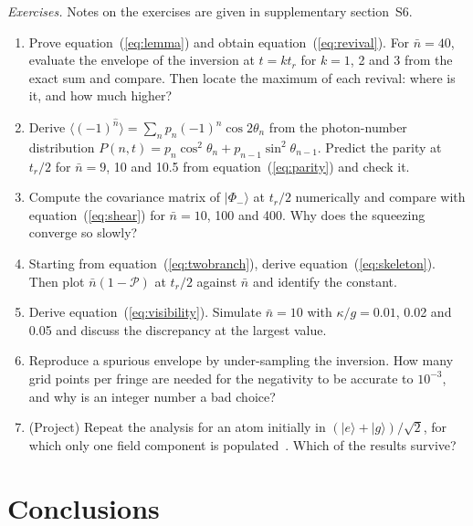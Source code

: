 \documentclass{iopjournal}
\newcommand{\nbar}{\bar{n}}
\newcommand{\ket}[1]{|#1\rangle}
\begin{document}
\textit{Exercises.} Notes on the exercises are given in supplementary section~S6.
\begin{enumerate}
\item Prove equation~(\ref{eq:lemma}) and obtain equation~(\ref{eq:revival}). For $\nbar = 40$, evaluate the envelope of the inversion at $t = kt_r$ for $k = 1$, 2 and 3 from the exact sum and compare. Then locate the maximum of each revival: where is it, and how much higher?
\item Derive $\langle(-1)^{\hat n}\rangle = \sum_n p_n(-1)^n\cos 2\theta_n$ from the photon-number distribution $P(n,t) = p_n\cos^2\theta_n + p_{n-1}\sin^2\theta_{n-1}$. Predict the parity at $t_r/2$ for $\nbar = 9$, 10 and 10.5 from equation~(\ref{eq:parity}) and check it.
\item Compute the covariance matrix of $\ket{\Phi_-}$ at $t_r/2$ numerically and compare with equation~(\ref{eq:shear}) for $\nbar = 10$, 100 and 400. Why does the squeezing converge so slowly?
\item Starting from equation~(\ref{eq:twobranch}), derive equation~(\ref{eq:skeleton}). Then plot $\nbar(1-\mathcal{P})$ at $t_r/2$ against $\nbar$ and identify the constant.
\item Derive equation~(\ref{eq:visibility}). Simulate $\nbar = 10$ with $\kappa/g = 0.01$, 0.02 and 0.05 and discuss the discrepancy at the largest value.
\item Reproduce a spurious envelope by under-sampling the inversion. How many grid points per fringe are needed for the negativity to be accurate to $10^{-3}$, and why is an integer number a bad choice?
\item (Project) Repeat the analysis for an atom initially in $(\ket{e}+\ket{g})/\sqrt2$, for which only one field component is populated~\cite{gea-banacloche1991}. Which of the results survive?
\end{enumerate}

\section{Conclusions}
\label{sec:conclusions}
\end{document}
